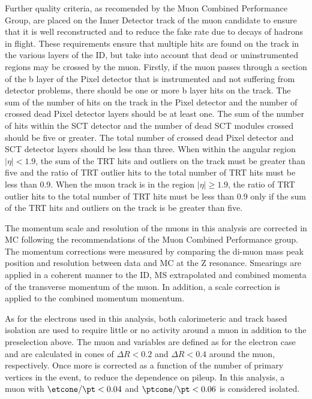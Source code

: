 Further quality criteria, as recomended by the Muon Combined Performance Group,
 are placed on the Inner Detector track of
the muon candidate to ensure that it is well reconstructed and to
reduce the fake rate due to decays of hadrons in flight. These
requirements ensure that multiple hits are found on the track in the
various layers of the ID, but take into account that dead or
uninstrumented regions may be crossed by the muon. Firstly, if the
muon passes through a section of the b layer of the Pixel detector
that is instrumented and not suffering from detector problems, there
should be one or more b layer hits on the track. The sum of the number
of hits on the track in the Pixel detector and the number of crossed
dead Pixel detector layers should be at least one. The sum of the
number of hits within the SCT detector and the number of dead SCT
modules crossed should be five or greater. The total number of crossed
dead Pixel detector and SCT detector layers should be less than three.
When within the angular region $|\eta|<1.9$, the sum of the TRT hits
and outliers on the track must be greater than five and the ratio of
TRT outlier hits to the total number of TRT hits must be less than
0.9. When the muon track is in the region $|\eta|\ge1.9$, the ratio of
TRT outlier hits to the total number of TRT hits must be less than 0.9
only if the sum of the TRT hits and outliers on the track is be
greater than five.

The momentum scale and resolution of the muons in this analysis are
corrected in MC following the recommendations of the Muon Combined
Performance group. The momentum corrections were measured by comparing
the di-muon mass peak position and resolution between data and MC at
the Z resonance. Smearings are applied in a coherent manner to
the ID, MS extrapolated and combined momenta of the transverse
momentum of the muon. In addition, a scale correction is applied to
the combined momentum momentum.

As for the electrons used in this analysis, both calorimeteric and
track based isolation are used to require little or no activity around a muon
in addition to the preselection above. The muon \etcone and \ptcone
variables are defined as for the electron case and are calculated
in cones of $\Delta R<0.2$ and $\Delta R<0.4$ around the muon, respectively. 
Once more \etcone is corrected as a function of the number of primary vertices in the
event, to reduce the dependence on pileup. In this analysis, a muon with
$\etcone/\pt<0.04$ and $\ptcone/\pt<0.06$ is considered isolated.



